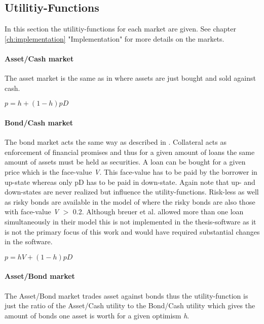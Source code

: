 \documentclass[../Bachelorarbeit.tex]{subfiles}
\begin{document}
\subsection{Utilitiy-Functions}
In this section the utilitiy-functions for each market are given. See chapter \ref{ch:implementation} "Implementation" for more details on the markets.

\paragraph{Asset/Cash market}
The asset market is the same as in \cite{Geanakoplos2009} where assets are just bought and sold against cash.

\begin{center}
$p = h + ( 1 - h )pD$
\end{center}

\paragraph{Bond/Cash market}
The bond market acts the same way as described in \cite{Geanakoplos2009}. Collateral acts as enforcement of financial promises and thus for a given amount of loans the same amount of assets must be held as securities. A loan can be bought for a given price which is the face-value \textit{V}. This face-value has to be paid by the borrower in up-state whereas only pD has to be paid in down-state. Again note that up- and down-states are never realized but influence the utility-functions.
\medskip
Risk-less as well as risky bonds are available in the model of \cite{Breuer2015} where the risky bonds are also those with face-value \textit{V} $>$ 0.2. Although breuer et al. allowed more than one loan simultaneously in their model this is not implemented in the thesis-software as it is not the primary focus of this work and would have required substantial changes in the software.

\begin{center}
$p = h V + ( 1 - h )pD$
\end{center}

\paragraph{Asset/Bond market}
The Asset/Bond market trades asset against bonds thus the utility-function is just the ratio of the Asset/Cash utility to the Bond/Cash utility which gives the amount of bonds one asset is worth for a given optimism \textit{h}.
\end{document}
